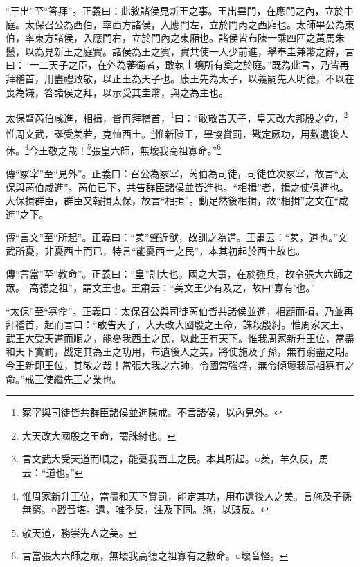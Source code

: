 {\noindent\shu{}\fzkt “王出”至“答拜”。正義曰：此敘諸侯見新王之事。王出畢門，在應門之內，立於中庭。太保召公為西伯，率西方諸侯，入應門左，立於門內之西廂也。太師畢公為東伯，率東方諸侯，入應門右，立於門內之東廂也。諸侯皆布陳一乘四匹之黃馬朱鬛，以為見新王之庭實。諸侯為王之賓，實共使一人少前進，舉奉圭兼幣之辭，言曰：“一二天子之臣，在外為蕃衛者，敢執土壤所有奠之於庭。”既為此言，乃皆再拜稽首，用盡禮致敬，以正王為天子也。康王先為太子，以義嗣先人明德，不以在喪為嫌，答諸侯之拜，以示受其圭幣，與之為主也。 \par}

太保暨芮伯咸進，相揖，皆再拜稽首，\footnote{冢宰與司徒皆共群臣諸侯並進陳戒。不言諸侯，以內見外。}曰：“敢敬告天子，皇天改大邦殷之命，\footnote{大天改大國殷之王命，謂誅紂也。}惟周文武，誕受羑若，克恤西土。\footnote{言文武大受天道而順之，能憂我西土之民。本其所起。○羑，羊久反，馬云：“道也。”}惟新陟王，畢協賞罰，戡定厥功，用敷遺後人休。\footnote{惟周家新升王位，當盡和天下賞罰，能定其功，用布遺後人之美。言施及子孫無窮。○戡音堪。遺，唯季反，注及下同。施，以豉反。}今王敬之哉！\footnote{敬天道，務崇先人之美。}張皇六師，無壞我高祖寡命。”\footnote{言當張大六師之眾，無壞我高德之祖寡有之教命。○壞音怪。}


{\noindent\zhuan{}\fzbyks 傳“冢宰”至“見外”。正義曰：召公為冢宰，芮伯為司徒，司徒位次冢宰，故言“太保與芮伯咸進”。芮伯已下，共告群臣諸侯並皆進也。“相揖”者，揖之使俱進也。大保揖群臣，群臣又報揖太保，故言“相揖”。動足然後相揖，故“相揖”之文在“咸進”之下。 \par}

{\noindent\zhuan{}\fzbyks 傳“言文”至“所起”。正義曰：“羑”聲近猷，故訓之為道。王肅云：“羑，道也。”文武所憂，非憂西土而已，特言“能憂西土之民”，本其初起於西土故也。 \par}

{\noindent\zhuan{}\fzbyks 傳“言當”至“教命”。正義曰：“皇”訓大也。國之大事，在於強兵，故令張大六師之眾。“高德之祖”，謂文王也。王肅云：“美文王少有及之，故曰‘寡有’也。” \par}

{\noindent\shu{}\fzkt “太保”至“寡命”。正義曰：太保召公與司徒芮伯皆共諸侯並進，相顧而揖，乃並再拜稽首，起而言曰：“敢告天子，大天改大國殷之王命，誅殺殷紂。惟周家文王、武王大受天道而順之，能憂我西土之民，以此王有天下。惟我周家新升王位，當盡和天下賞罰，戡定其為王之功用，布遺後人之美，將使施及子孫，無有窮盡之期。今王新即王位，其敬之哉！當張大我之六師，令國常強盛，無令傾壞我高祖寡有之命。”戒王使繼先王之業也。 \par}

